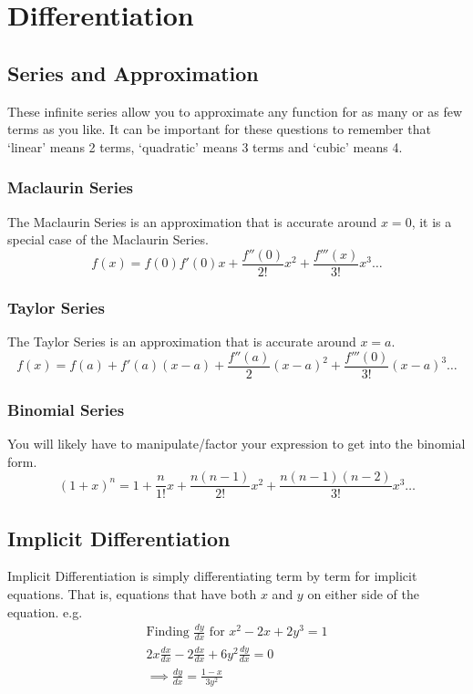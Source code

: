 \documentclass[12pt] {article}
\begin{document}
\section{Differentiation}
\subsection*{Series and Approximation}
These infinite series allow you to approximate any function for as many or as few terms as you like.
It can be important for these questions to remember that `linear' means 2 terms, `quadratic' means 3 terms and `cubic' means 4.
\subsubsection*{Maclaurin Series}
The Maclaurin Series is an approximation that is accurate around $x=0$, it is a special case of the Maclaurin Series.
\begin{equation*}
  f(x)=f(0)f'(0)x+\frac{f''(0)}{2!}x^2+\frac{f'''(x)}{3!}x^3 \dotsc
\end{equation*}
\subsubsection*{Taylor Series}
The Taylor Series is an approximation that is accurate around $x=a$.
\begin{equation*}
  f(x) = f(a) + f'(a)(x-a) + \frac{f''(a)}{2}(x-a)^2 + \frac{f'''(0)}{3!}(x-a)^3 \dotsc
\end{equation*}
\subsubsection*{Binomial Series}
You will likely have to manipulate/factor your expression to get into the binomial form.
\begin{equation*}
  (1+x)^n = 1 + \frac{n}{1!}x + \frac{n(n-1)}{2!}x^2 + \frac{n(n-1)(n-2)}{3!}x^3 \dotsc
\end{equation*}
\subsection*{Implicit Differentiation}
Implicit Differentiation is simply differentiating term by term for implicit equations.
That is, equations that have both $x$ and $y$ on either side of the equation. e.g.
\begin{gather*}
  \text{Finding } \frac{dy}{dx} \text{ for } x^2-2x+2y^3=1 \\
  2x\frac{dx}{dx} -2\frac{dx}{dx} +6y^2\frac{dy}{dx}=0 \\
  \implies \frac{dy}{dx} = \frac{1-x}{3y^2}
\end{gather*}
\end{document}
